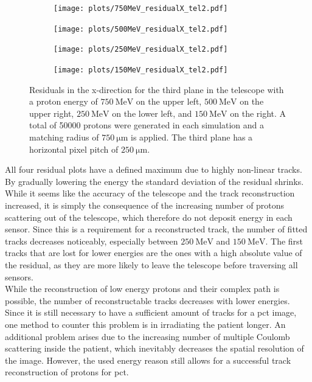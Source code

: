 \begin{figure}
  \hspace{-2.5cm}
  \begin{subfigure}{0.62\textwidth}
      \centering
      \texttt{[image: plots/750MeV\_residualX\_tel2.pdf]}
  \end{subfigure}
  \begin{subfigure}{0.62\textwidth}
      \hspace{0.95cm}
      \texttt{[image: plots/500MeV\_residualX\_tel2.pdf]}
  \end{subfigure}
  \begin{subfigure}{0.62\textwidth}
      \hspace{-2.5cm}
      \texttt{[image: plots/250MeV\_residualX\_tel2.pdf]}
  \end{subfigure}
  \begin{subfigure}{0.62\textwidth}
      \hspace{-1.5cm}
      \texttt{[image: plots/150MeV\_residualX\_tel2.pdf]}
  \end{subfigure}
  \caption{Residuals in the x-direction for the third plane in the telescope with a proton energy of $\SI{750}{\mega\eV}$ on the upper left, $\SI{500}{\mega\eV}$ on the
  upper right, $\SI{250}{\mega\eV}$ on the lower left,
  and $\SI{150}{\mega\eV}$ on the right. A total of 50000 protons were generated in each simulation and a matching radius of $\SI{750}{\micro\meter}$ is applied. The third plane has
  a horizontal pixel pitch of $\SI{250}{\micro\meter}$.}
  \label{fig:low}
\end{figure}

All four residual plots have a defined maximum due to highly non-linear tracks. By gradually lowering the energy the standard deviation of the residual shrinks. While
it seems like the accuracy of the telescope and the track reconstruction increased, it is simply the consequence of the increasing number of protons scattering
out of the telescope, which therefore do not deposit energy in each sensor. Since this is a requirement for a reconstructed track, the number of fitted tracks decreases
noticeably, especially between $\SI{250}{\mega\eV}$ and $\SI{150}{\mega\eV}$. The first tracks that are lost for lower energies
are the ones with a high absolute value of the residual, as they are more likely to leave the telescope before traversing all sensors. \\
While the reconstruction of low energy protons and their complex path is possible, the number of reconstructable tracks decreases with lower energies.
Since it is still necessary to have a sufficient amount of tracks for a pct image, one method to counter this problem is in irradiating the patient longer.
An additional problem arises due to the increasing number of multiple Coulomb scattering inside the patient, which inevitably decreases the spatial resolution of the image.
However, the used energy reason still allows for a successful track reconstruction of protons for pct.


